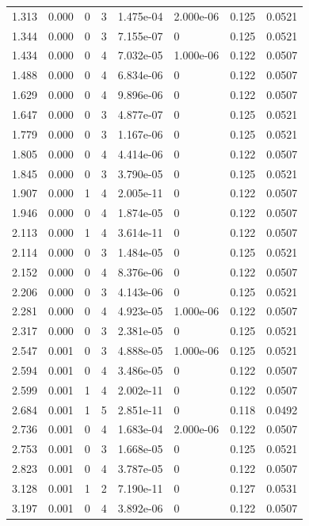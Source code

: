 \documentclass[preview]{standalone}
\begin{document}
{{\begin{tabular}{L{1.2cm}C{1.2cm} C{0.3cm}C{0.5cm} C{1.4cm}C{1.4cm} C{1.4cm}C{1.4cm}}
  1.313  &  0.000  & 0     &  3 &  1.475e-04  & 2.000e-06  & 0.125 &  0.0521   \\ 
  1.344  &  0.000  & 0     &  3 &  7.155e-07  & 0  & 0.125 &  0.0521   \\ 
  1.434  &  0.000  & 0     &  4 &  7.032e-05  & 1.000e-06  & 0.122 &  0.0507   \\ 
  1.488  &  0.000  & 0     &  4 &  6.834e-06  & 0  & 0.122 &  0.0507   \\ 
  1.629  &  0.000  & 0     &  4 &  9.896e-06  & 0  & 0.122 &  0.0507   \\ 
  1.647  &  0.000  & 0     &  3 &  4.877e-07  & 0  & 0.125 &  0.0521   \\ 
  1.779  &  0.000  & 0     &  3 &  1.167e-06  & 0  & 0.125 &  0.0521   \\ 
  1.805  &  0.000  & 0     &  4 &  4.414e-06  & 0  & 0.122 &  0.0507   \\ 
  1.845  &  0.000  & 0     &  3 &  3.790e-05  & 0  & 0.125 &  0.0521   \\ 
  1.907  &  0.000  & 1     &  4 &  2.005e-11  & 0  & 0.122 &  0.0507   \\ 
  1.946  &  0.000  & 0     &  4 &  1.874e-05  & 0  & 0.122 &  0.0507   \\ 
  2.113  &  0.000  & 1     &  4 &  3.614e-11  & 0  & 0.122 &  0.0507   \\ 
  2.114  &  0.000  & 0     &  3 &  1.484e-05  & 0  & 0.125 &  0.0521   \\ 
  2.152  &  0.000  & 0     &  4 &  8.376e-06  & 0  & 0.122 &  0.0507   \\ 
  2.206  &  0.000  & 0     &  3 &  4.143e-06  & 0  & 0.125 &  0.0521   \\ 
  2.281  &  0.000  & 0     &  4 &  4.923e-05  & 1.000e-06  & 0.122 &  0.0507   \\ 
  2.317  &  0.000  & 0     &  3 &  2.381e-05  & 0  & 0.125 &  0.0521   \\ 
  2.547  &  0.001  & 0     &  3 &  4.888e-05  & 1.000e-06  & 0.125 &  0.0521   \\ 
  2.594  &  0.001  & 0     &  4 &  3.486e-05  & 0  & 0.122 &  0.0507   \\ 
  2.599  &  0.001  & 1     &  4 &  2.002e-11  & 0  & 0.122 &  0.0507   \\ 
  2.684  &  0.001  & 1     &  5 &  2.851e-11  & 0  & 0.118 &  0.0492   \\ 
  2.736  &  0.001  & 0     &  4 &  1.683e-04  & 2.000e-06  & 0.122 &  0.0507   \\ 
  2.753  &  0.001  & 0     &  3 &  1.668e-05  & 0  & 0.125 &  0.0521   \\ 
  2.823  &  0.001  & 0     &  4 &  3.787e-05  & 0  & 0.122 &  0.0507   \\ 
  3.128  &  0.001  & 1     &  2 &  7.190e-11  & 0  & 0.127 &  0.0531   \\ 
  3.197  &  0.001  & 0     &  4 &  3.892e-06  & 0  & 0.122 &  0.0507   \\ 
\hline 
\end{tabular} 

}}
\end{document}
